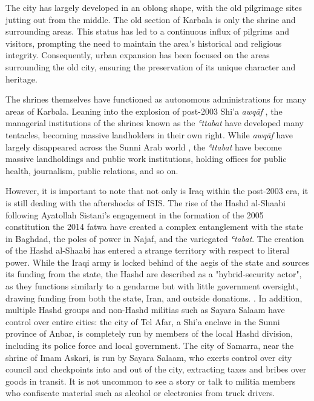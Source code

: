 The city has largely developed in an oblong shape, with the old pilgrimage sites jutting out from the middle. The old section of Karbala is only the shrine and surrounding areas. This status has led to a continuous influx of pilgrims and visitors, prompting the need to maintain the area's historical and religious integrity. Consequently, urban expansion has been focused on the areas surrounding the old city, ensuring the preservation of its unique character and heritage.

The shrines themselves have functioned as autonomous administrations for many areas of Karbala. Leaning into the explosion of post-2003 Shi'a \emph{awqāf} \cite{hamdan_development_2012}, the managerial institutions of the shrines known as the \emph{ʿttabat}  have developed many tentacles, becoming massive landholders in their own right. While \emph{awqāf} have largely disappeared across the Sunni Arab world \cite{moumtaz_gods_2021}, the \emph{ʿttabat}  have become massive landholdings and public work institutions, holding offices for public health, journalism, public relations, and so on. 

However, it is important to note that not only is Iraq within the post-2003 era, it is still dealing with the aftershocks of ISIS. The rise of the Hashd al-Shaabi following Ayatollah Sistani's engagement in the formation of the 2005 constitution \cite{al-rahim_sistani_2005} the 2014 fatwa \cite{rudolf_battlefield_2018}\cite{ann_wainscott_engaging_2019} have created a complex entanglement with the state in Baghdad, the poles of power in Najaf, and the variegated \emph{ʿtabat}. The creation of the Hashd al-Shaabi has entered a strange territory with respect to literal power. While the Iraqi army is locked behind of the aegis of the state and sources its funding from the state, the Hashd are described as a "hybrid-security actor", as they functions similarly to a gendarme but with little government oversight, drawing funding from both the state, Iran, and outside donations.\cite{cambanis_hybrid_2019} \cite{renad_mansour_popular_2018}. In addition, multiple Hashd groups and non-Hashd militias such as Sayara Salaam have control over entire cities: the city of Tel Afar, a Shi'a enclave in the Sunni province of Anbar, is completely run by members of the local Hashd division, including its police force and local government. The city of Samarra, near the shrine of Imam Askari, is run by Sayara Salaam, who exerts control over city council and checkpoints into and out of the city, extracting taxes and bribes over goods in transit. It is not uncommon to see a story or talk to militia members who confiscate material such as alcohol or electronics from truck drivers. 

